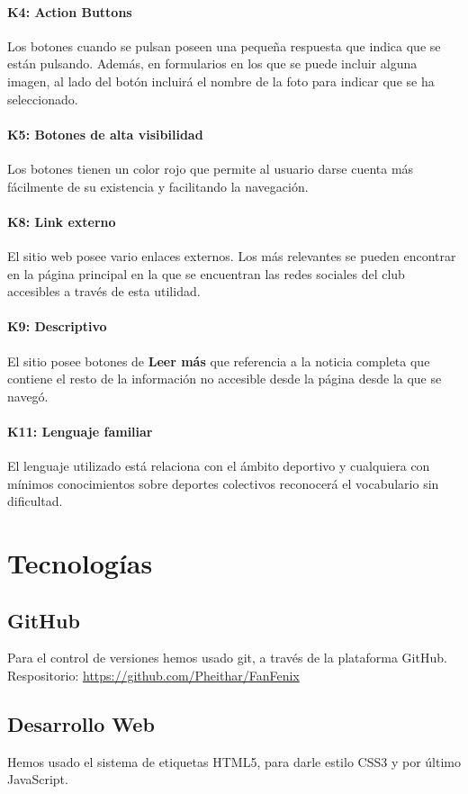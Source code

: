 \documentclass[10pt, spanish, pdftex]{template/UC3M_document}
\begin{document}
\paragraph{K4: Action Buttons}
  Los botones cuando se pulsan poseen una pequeña respuesta que indica que se están pulsando. Además, en formularios en los que se puede incluir alguna imagen, al lado del botón incluirá el nombre de la foto para indicar que se ha seleccionado.
\paragraph{K5: Botones de alta visibilidad}
  Los botones tienen un color rojo que permite al usuario darse cuenta más fácilmente de su existencia y facilitando la navegación.
\paragraph{K8: Link externo}
  El sitio web posee vario enlaces externos. Los más relevantes se pueden encontrar en la página principal en la que se encuentran las redes sociales del club accesibles a través de esta utilidad.
\paragraph{K9: Descriptivo}
  El sitio posee botones de \textbf{Leer más} que referencia a la noticia completa que contiene el resto de la información no accesible desde la página desde la que se navegó.
\paragraph{K11: Lenguaje familiar}
  El lenguaje utilizado está relaciona con el ámbito deportivo y cualquiera con mínimos conocimientos sobre deportes colectivos reconocerá el vocabulario sin dificultad.



\newpage

\section{Tecnologías}
\subsection{GitHub}
Para el control de versiones hemos usado git, a través de la plataforma GitHub. Respositorio: \url{https://github.com/Pheithar/FanFenix}
\subsection{Desarrollo Web}
Hemos usado el sistema de etiquetas HTML5, para darle estilo CSS3 y por último JavaScript.
\end{document}
